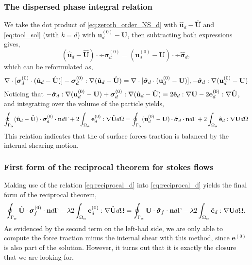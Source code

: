 \subsubsection{The dispersed phase integral relation}

We take the dot product of \ref{eq:zeroth_order_NS_d} with $\hat{\textbf{u}}_d - \hat{\textbf{U}}$ and \ref{eq:tool_sol} (with $k=d$) with $\textbf{u}_d^{(0)} -\textbf{U}$, then subtracting both expressions gives, 
\begin{equation*}
    (\hat{\textbf{u}}_d - \hat{\textbf{U}})\cdot \div\bm\sigma_d^{(0)}
    =
    (\textbf{u}_d^{(0)} - \textbf{U}) \cdot \div \hat{\bm\sigma}_d, 
\end{equation*}
which can be reformulated as, 
\begin{equation*}
    \mathbf{\nabla}\cdot [\bm\sigma_d^{(0)} \cdot (\hat{\textbf{u}}_d - \hat{\textbf{U}})]
    - \bm\sigma_d^{(0)} : \mathbf{\nabla} (\hat{\textbf{u}}_d - \hat{\textbf{U}})
    =
    \mathbf{\nabla}\cdot [\hat{\bm\sigma}_d \cdot (\textbf{u}_d^{(0)} - \textbf{U})], 
    - \hat{\bm\sigma}_d : \mathbf{\nabla} ({\textbf{u}}_d^{(0)} - \textbf{U})
\end{equation*}
Noticing that $- \hat{\bm\sigma}_d : \mathbf{\nabla} ({\textbf{u}}_d^{(0)} - \textbf{U}) + \bm\sigma_d^{(0)} : \mathbf{\nabla} (\hat{\textbf{u}}_d - \hat{\textbf{U}}) = 2 \hat{\textbf{e}}_d : \mathbf{\nabla} \textbf{U} - 2 \textbf{e}_d^{(0)} : \mathbf{\nabla} \hat{\textbf{U}}$, and integrating over the volume of the particle yields, 
\begin{equation}
    \intS{(\hat{\textbf{u}}_d - \hat{\textbf{U}})\cdot \bm\sigma_d^{(0)} \cdot \textbf{n}}
    + 2\intO{\textbf{e}_d^{(0)} : \grad \hat{\textbf{U}}}
    =
    \intS{(\textbf{u}_d^{(0)} - \textbf{U}) \cdot  \hat{\bm\sigma}_d\cdot \textbf{n} }
    + 2\intO{\hat{\textbf{e}}_d : \grad \textbf{U}} 
    \label{eq:reciprocal_d}
\end{equation}
This relation indicates that the of surface forces traction is balanced by the internal shearing motion. 


\subsubsection{First form of the reciprocal theorem for stokes flows}

Making use of the relation \ref{eq:reciprocal_d} into \ref{eq:reciprocal_d} yields the final form of the reciprocal theorem, 
\begin{equation}
    \intS{\hat{\textbf{U}}\cdot  \bm\sigma_f^{(0)} \cdot \textbf{n}}
    - \lambda 2\intO{\textbf{e}_d^{(0)} : \grad \hat{\textbf{U}}}
    = 
    \intS{\textbf{U}\cdot  \hat{\bm\sigma}_f \cdot \textbf{n}}
    -\lambda  2\intO{\hat{\textbf{e}}_d : \grad \textbf{U}}. 
    \label{eq:reciprocal_all}
\end{equation}
As evidenced by the second term on the left-had side, we are only able to compute the force traction minus the internal shear with this method, since $\textbf{e}^{(0)}$ is also part of the solution.
However, it turns out that it is exactly the closure that we are looking for.  



